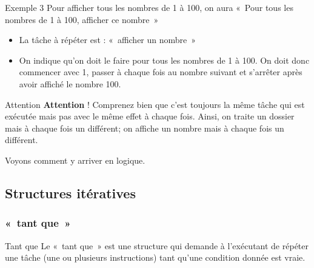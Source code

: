 \begin{frame}{Exemple 3}
	Pour afficher tous les nombres de 1 à 100, on aura
	«~Pour tous les nombres de 1 à 100, afficher ce nombre~»

	\begin{itemize}
	\item
		La tâche à répéter est : «~afficher un nombre~»
	\item 
		On indique qu'on doit le faire pour tous les nombres de
		1 à 100. On doit donc commencer avec 1, passer à chaque fois au nombre
		suivant et s'arrêter après avoir affiché le nombre
		100.
	\end{itemize}
\end{frame}

\begin{frame}{Attention}
	\textbf{Attention} ! Comprenez bien que c'est toujours
	la même tâche qui est exécutée mais pas avec le même effet à chaque
	fois. Ainsi, on traite un dossier mais à chaque fois un différent; on
	affiche un nombre mais à chaque fois un différent. 
	
	Voyons comment	y arriver en logique.
\end{frame}

\subsection{Structures itératives}

\subsubsection{«~tant que~»}

\begin{frame}{Tant que}
	Le «~tant que~» est une structure qui demande à
	l'exécutant de répéter une tâche (une ou plusieurs
	instructions) tant qu'une condition donnée est vraie.

	\bigskip


\end{frame}

